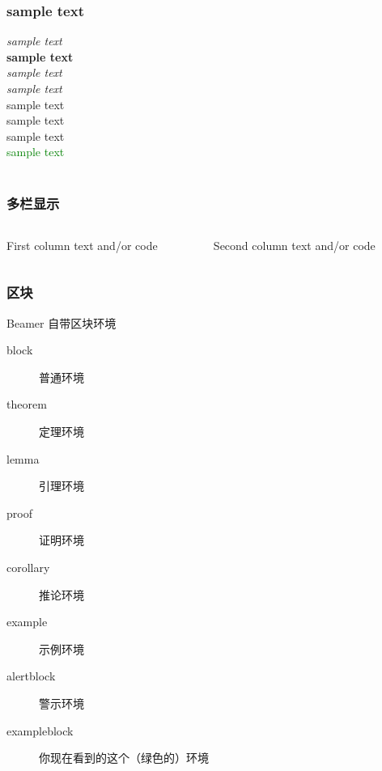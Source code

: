\begin{frame}
    \frametitle{sample text}
    \emph{sample text}\\
    \textbf{sample text}\\
    \textit{sample text}\\
    \textsl{sample text}\\
    \alert{sample text}\\
    \textrm{sample text}\\
    \textsf{sample text}\\
    \textcolor{green}{sample text}\\
    \\
\end{frame}

\begin{frame}
    \frametitle{多栏显示}
    \begin{columns}
        \begin{column}{.3\textwidth}
            First column text and/or code
        \end{column}
        \begin{column}{.7\textwidth}
            Second column text and/or code
        \end{column}
    \end{columns}
\end{frame}

\begin{frame}
    \frametitle{区块}
    \begin{exampleblock}{Beamer 自带区块环境}
        \begin{description}
            \item[block] 普通环境
            \item[theorem] 定理环境
            \item[lemma] 引理环境
            \item[proof] 证明环境
            \item[corollary] 推论环境
            \item[example] 示例环境
            \item[alertblock] 警示环境
            \item[exampleblock] 你现在看到的这个（绿色的）环境
        \end{description}
    \end{exampleblock}
\end{frame}

